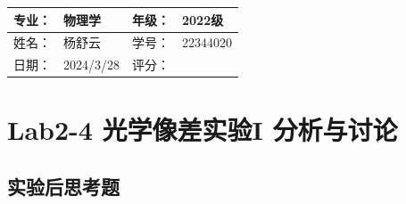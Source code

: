 \documentclass[dvipsnames, svgnames,a4paper,11pt]{article}
\begin{document}
	
	
	\clearpage
	
	\begin{table}
		\renewcommand\arraystretch{1.7}
		\begin{tabularx}{\textwidth}{|X|X|X|X|}
			\hline
			专业：& 物理学 &年级：& 2022级\\
			\hline
			姓名： & 杨舒云 & 学号：& 22344020\\
			\hline
			日期：& 2024/3/28 & 评分： &\\
			\hline
		\end{tabularx}
	\end{table}
	
	\section{Lab2-4 光学像差实验I \quad\heiti 分析与讨论}
	
	\subsection{实验后思考题}
	
\end{document}
